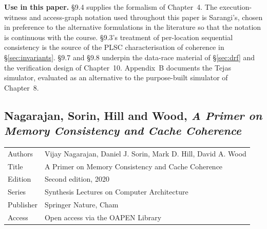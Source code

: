 \noindent \textbf{Use in this paper.} \S9.4 supplies the formalism of Chapter~4.
The execution-witness and access-graph notation used throughout this paper is
Sarangi's, chosen in preference to the alternative formulations in the literature
so that the notation is continuous with the course.
\S9.3's treatment of
per-location sequential consistency is the source of the PLSC characterisation of
coherence in \S\ref{sec:invariants}.
\S9.7 and \S9.8 underpin the data-race
material of \S\ref{sec:drf} and the verification design of Chapter~10.
Appendix~B documents the Tejas simulator, evaluated as an alternative to the
purpose-built simulator of Chapter~8.

\subsection{Nagarajan, Sorin, Hill and Wood, \emph{A Primer on Memory
Consistency and Cache Coherence}}

\begin{table}[H]
\centering
\small
\begin{tabular}{@{}ll@{}}
\toprule
Authors     & Vijay Nagarajan, Daniel J. Sorin, Mark D. Hill, David A. Wood \\
Title       & A Primer on Memory Consistency and Cache Coherence \\
Edition     & Second edition, 2020 \\
Series      & Synthesis Lectures on Computer Architecture \\
Publisher   & Springer Nature, Cham \\
Access      & Open access via the OAPEN Library \\
\bottomrule
\end{tabular}
\end{table}

